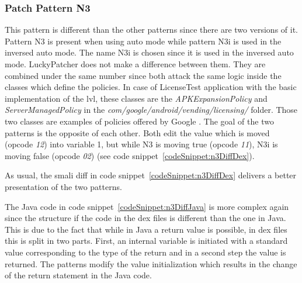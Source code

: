 \subsubsection{Patch Pattern N3}
This pattern is different than the other patterns since there are two versions of it.
Pattern N3 is present when using auto mode while pattern N3i is used in the inversed auto mode.
The name N3i is chosen since it is used in the inversed auto mode.
LuckyPatcher does not make a difference between them.
They are combined under the same number since both attack the same logic inside the classes which define the policies.
In case of LicenseTest application with the basic implementation of the \gls{lvl}, these classes are the \textit{APKExpansionPolicy} and \textit{ServerManagedPolicy} in the  \textit{com/google/android/vending/licensing/} folder.
Those two classes are examples of policies offered by Google \cite{developersLicensingReference}.
The goal of the two patterns is the opposite of each other.
Both edit the value which is moved (opcode \textit{12}) into variable 1, but while N3 is moving true (opcode \textit{11}), N3i is moving false (opcode \textit{02}) (see code snippet~\ref{codeSnippet:n3DiffDex}).
\newline

As usual, the smali diff in code snippet~\ref{codeSnippet:n3DiffDex} delivers a better presentation of the two patterns.
\newline

The Java code in code snippet~\ref{codeSnippet:n3DiffJava} is more complex again since the structure if the code in the \gls{dex} files is different than the one in Java.
This is due to the fact that while in Java a \gls{return value} is possible, in \gls{dex} files this is split in two parts.
First, an internal variable is initiated with a standard value corresponding to the type of the return and in a second step the value is returned.
The patterns modify the value initialization which results in the change of the return statement in the Java code.
\newline


